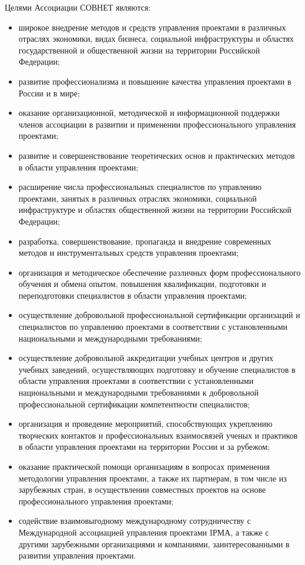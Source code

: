 Целями Ассоциации СОВНЕТ являются:
\begin{itemize}
	\item широкое внедрение методов и средств управления проектами в различных отраслях экономики, видах бизнеса, социальной инфраструктуры и областях государственной и общественной жизни на территории Российской Федерации;
	\item развитие профессионализма и повышение качества управления проектами в России и в мире;
	\item оказание организационной, методической и информационной поддержки членов ассоциации в развитии и применении профессионального управления проектами;
	\item развитие и совершенствование теоретических основ и практических методов в области управления проектами;
	\item расширение числа профессиональных специалистов по управлению проектами, занятых в различных отраслях экономики, социальной инфраструктуре и областях общественной жизни на территории Российской Федерации;
	\item разработка, совершенствование, пропаганда и внедрение современных методов и инструментальных средств управления проектами;
	\item организация и методическое обеспечение различных форм профессионального обучения и обмена опытом, повышения квалификации, подготовки и переподготовки специалистов в области управления проектами;
	\item осуществление добровольной профессиональной сертификации организаций и специалистов по управлению проектами в соответствии с установленными национальными и международными требованиями;
	\item осуществление добровольной аккредитации учебных центров и других учебных заведений, осуществляющих подготовку и обучение специалистов в области управления проектами в соответствии с установленными национальными и международными требованиями к добровольной профессиональной сертификации компетентности специалистов;
	\item организация и проведение мероприятий, способствующих укреплению творческих контактов и профессиональных взаимосвязей ученых и практиков в области управления проектами на территории России и за рубежом;
	\item оказание практической помощи организациям в вопросах применения методологии управления проектами, а также их партнерам, в том числе из зарубежных стран, в осуществлении совместных проектов на основе профессионального управления проектами;
	\item содействие взаимовыгодному международному сотрудничеству с Международной ассоциацией управления проектами IРМА, а также с другими зарубежными организациями и компаниями, заинтересованными в развитии управления проектами.
\end{itemize}

